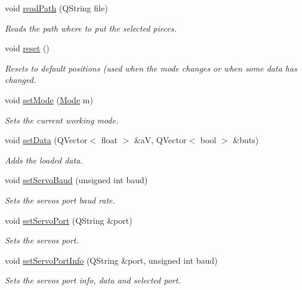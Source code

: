 \begin{DoxyCompactItemize}
void \hyperlink{a00009_ae236c55f7d673653d329e1655df349a2}{read\+Path} (Q\+String file)
\begin{DoxyCompactList}\small\item\em Reads the path where to put the selected pieces. \end{DoxyCompactList}\item 
void \hyperlink{a00009_a4f7371fed61d98cf6f128876e8fa518d}{reset} ()
\begin{DoxyCompactList}\small\item\em Resets to default positions (used when the mode changes or when some data has changed. \end{DoxyCompactList}\item 
void \hyperlink{a00009_af97b6a355e9278e02fbe8c36e144ed33}{set\+Mode} (\hyperlink{a00009_a8d581034e60792a9995d44065f6140a5}{Mode} m)
\begin{DoxyCompactList}\small\item\em Sets the current working mode. \end{DoxyCompactList}\item 
void \hyperlink{a00009_a8497ea56991b620981ce1fbf53d9ebdb}{set\+Data} (Q\+Vector$<$ float $>$ \&a\+V, Q\+Vector$<$ bool $>$ \&buts)
\begin{DoxyCompactList}\small\item\em Adds the loaded data. \end{DoxyCompactList}\item 
void \hyperlink{a00009_a009d3d1b99007b14fadb49996fac49d6}{set\+Servo\+Baud} (unsigned int baud)
\begin{DoxyCompactList}\small\item\em Sets the servos port baud rate. \end{DoxyCompactList}\item 
void \hyperlink{a00009_a144e31105019d833f59ca2eba012e638}{set\+Servo\+Port} (Q\+String \&port)
\begin{DoxyCompactList}\small\item\em Sets the servos port. \end{DoxyCompactList}\item 
void \hyperlink{a00009_a76af3e89d1a8705426584bedb0624909}{set\+Servo\+Port\+Info} (Q\+String \&port, unsigned int baud)
\begin{DoxyCompactList}\small\item\em Sets the servos port info, data and selected port. \end{DoxyCompactList}\item 

\end{DoxyCompactItemize}
